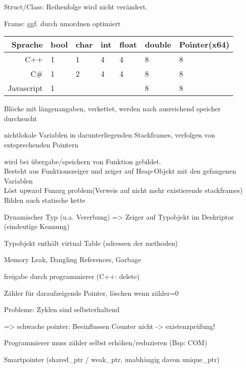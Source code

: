 Struct/Class: Reihenfolge wird nicht verändert.

Frame: ggf. durch umordnen optimiert

\begin{tabular}{|r|l|l|l|l|l|l|}
\hline
Sprache & bool & char & int & float & double & Pointer(x64) \\ 
\hline
C++ & 1&1 & 4 &4&8&8\\
\hline
C\# & 1&2 & 4 &4&8&8\\
\hline
Javascript & 1 &&&&8&8\\
\hline
\end{tabular}


Blöcke mit längenangaben, verkettet, werden nach ausreichend speicher durchsucht

 nichtlokale Variablen in darunterliegenden Stackframes, verfolgen von entsprechenden Pointern

 wird bei übergabe/speichern von Funktion gebildet.\\ Besteht aus Funktionszeiger und zeiger auf Heap-Objekt mit den gefangenen Variablen\\
Löst upward Funarg problem(Verweis auf nicht mehr existierende stackframes)\\
Bilden auch statische kette








Dynamischer Typ (u.a. Vererbung) => Zeiger auf Typobjekt im Deskriptor (eindeutige Kennung)

Typobjekt enthält virtual Table (adressen der methoden)


 Memory Leak, Dangling References, Garbage

freigabe durch programmierer (C++: delete)

Zähler für daraufzeigende Pointer, löschen wenn zähler=0

Probleme: Zyklen sind selbsterhaltend 

=> schwache pointer: Beeinflussen Counter nicht -> existenzprüfung!

 Programmierer muss zähler selbst erhöhen/reduzieren (Bsp: COM)

 Smartpointer (shared\_ptr / weak\_ptr, unabhängig davon unique\_ptr)

